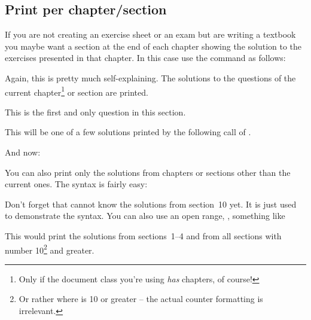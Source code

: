 \documentclass[load-preamble+]{cnltx-doc}
\begin{document}
\subsection{Print per chapter/section}
If you are not creating an exercise sheet or an exam but are writing a
textbook you maybe want a section at the end of each chapter showing the
solution to the exercises presented in that chapter.  In this case use the
command as follows:
\begin{sourcecode}
  \printsolutions[section]
  \printsolutions[chapter]
\end{sourcecode}
Again, this is pretty much self-explaining.  The solutions to the questions of
the current chapter\footnote{Only if the document class you're using
  \emph{has} chapters, of course!} or section are printed.
\begin{example}
  \begin{question}
    This is the first and only question in this section.
  \end{question}
  \begin{solution}
    This will be one of a few solutions printed by the following call of
    .
  \end{solution}
  And now:
  \printsolutions[section]
\end{example}

\label{sssec:print_specific_section}
You can also print only the solutions from chapters or sections other than the
current ones.  The syntax is fairly easy:
\begin{example}
  \printsolutions[section={1-7,10}]
\end{example}
Don't forget that  cannot know the solutions from
section~10 yet.  It is just used to demonstrate the syntax. You can also use
an open range, \eg, something like
\begin{sourcecode}
  \printsolutions[section={-4,10-}]
\end{sourcecode}
This would print the solutions from sections~1--4 and from all sections with
number 10\footnote{Or rather where  is 10 or greater --
  the actual counter formatting is irrelevant.} and greater.
\end{document}
